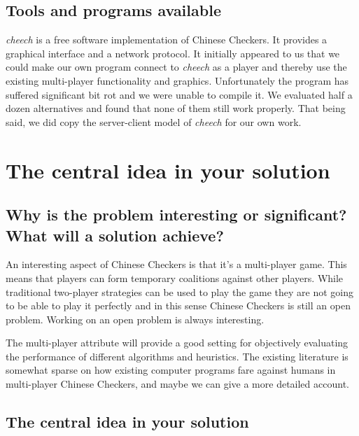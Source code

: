 \documentclass[a4paper,11pt]{article}
\begin{document}
\subsection{Tools and programs available}
\emph{cheech} is a free software implementation of Chinese Checkers.
It provides a graphical interface and a network protocol. It initially
appeared to us that we could make our own program connect to
\emph{cheech} as a player and thereby use the existing multi-player
functionality and graphics. Unfortunately the program has suffered
significant bit rot and we were unable to compile it. We evaluated
half a dozen alternatives and found that none of them still work
properly. That being said, we did copy the server-client model of
\emph{cheech} for our own work.

\section{The central idea in your solution}
\subsection{Why is the problem interesting or significant?  What will a solution
achieve?}

An interesting aspect of Chinese Checkers is that it's a multi-player
game. This means that players can form temporary coalitions against
other players. While traditional two-player strategies can be used to
play the game they are not going to be able to play it perfectly and
in this sense Chinese Checkers is still an open problem. Working on an
open problem is always interesting.

The multi-player attribute will provide a good setting for objectively
evaluating the performance of different algorithms and heuristics. The
existing literature is somewhat sparse on how existing computer
programs fare against humans in multi-player Chinese Checkers, and
maybe we can give a more detailed account.

\subsection{The central idea in your solution}
\end{document}
